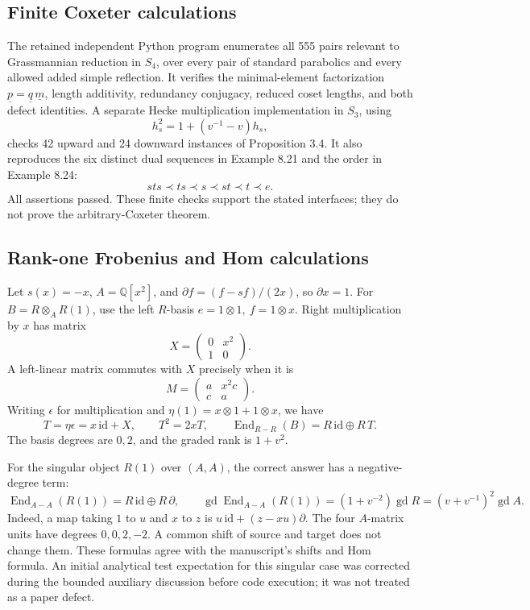 \documentclass[10pt]{article}
\begin{document}
\subsection*{Finite Coxeter calculations}
The retained independent Python program enumerates all 555 pairs relevant to Grassmannian reduction in \(S_4\), over every pair of standard parabolics and every allowed added simple reflection. It verifies the minimal-element factorization \(\underline p=\underline q\,\underline m\), length additivity, redundancy conjugacy, reduced coset lengths, and both defect identities. A separate Hecke multiplication implementation in \(S_3\), using \[h_s^2=1+(v^{-1}-v)h_s,\] checks 42 upward and 24 downward instances of Proposition 3.4. It also reproduces the six distinct dual sequences in Example 8.21 and the order in Example 8.24: \[sts\prec ts\prec s\prec st\prec t\prec e .\] All assertions passed. These finite checks support the stated interfaces; they do not prove the arbitrary-Coxeter theorem.\par
\subsection*{Rank-one Frobenius and Hom calculations}
Let \(s(x)=-x\), \(A=\mathbb Q[x^2]\), and \(\partial f=(f-sf)/(2x)\), so \(\partial x=1\). For \(B=R\otimes_A R(1)\), use the left \(R\)-basis \(e=1\otimes1,\ f=1\otimes x\). Right multiplication by \(x\) has matrix \[X=\begin{pmatrix}0&x^2\\1&0\end{pmatrix}.\] A left-linear matrix commutes with \(X\) precisely when it is \[M=\begin{pmatrix}a&x^2c\\c&a\end{pmatrix}.\] Writing \(\epsilon\) for multiplication and \(\eta(1)=x\otimes1+1\otimes x\), we have \[T=\eta\epsilon=x\,\mathrm{id}+X,\qquad
 T^2=2xT,\qquad
 \operatorname{End}_{R-R}(B)=R\,\mathrm{id}\oplus R\,T.\] The basis degrees are \(0,2\), and the graded rank is \(1+v^2\).\par
For the singular object \(R(1)\) over \((A,A)\), the correct answer has a negative-degree term: \[\operatorname{End}_{A-A}(R(1))
 =R\,\mathrm{id}\oplus R\,\partial,\qquad
 \operatorname{gd}\operatorname{End}_{A-A}(R(1))
 =(1+v^{-2})\operatorname{gd}R=(v+v^{-1})^2\operatorname{gd}A.\] Indeed, a map taking \(1\) to \(u\) and \(x\) to \(z\) is \(u\,\mathrm{id}+(z-xu)\partial\). The four \(A\)-matrix units have degrees \(0,0,2,-2\). A common shift of source and target does not change them. These formulas agree with the manuscript’s shifts and Hom formula. An initial analytical test expectation for this singular case was corrected during the bounded auxiliary discussion before code execution; it was not treated as a paper defect.\par
\end{document}

